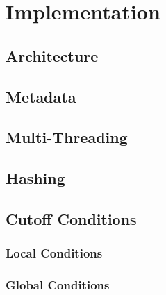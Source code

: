 \chapter{Implementation}
\label{chap:impl}

	\section{Architecture}
	
	\section{Metadata}
	
	\section{Multi-Threading}
	
	\section{Hashing}
	
	\section{Cutoff Conditions}
	
		\subsection{Local Conditions}
		
		\subsection{Global Conditions}
